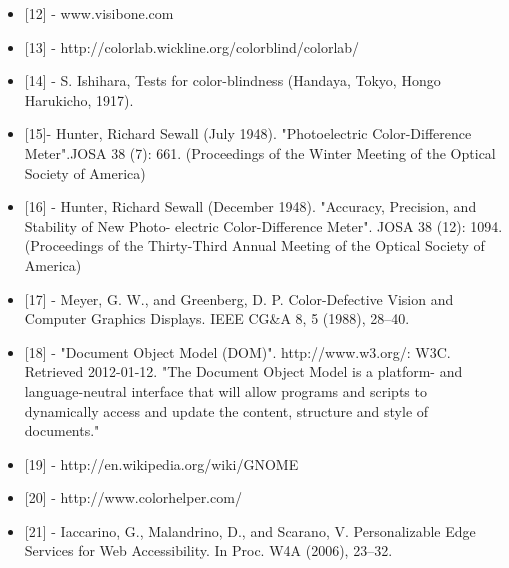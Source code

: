 \begin{itemize}
\item{[12]} - www.visibone.com

\item{[13]} - http://colorlab.wickline.org/colorblind/colorlab/

\item{[14]} - S. Ishihara, Tests for color-blindness (Handaya, Tokyo, Hongo Harukicho, 1917).

\item{[15]}- Hunter, Richard Sewall (July 1948). "Photoelectric Color-Difference Meter".JOSA 38 (7): 661.
(Proceedings of the Winter Meeting of the Optical Society of America)

\item{[16]} - Hunter, Richard Sewall (December 1948). "Accuracy, Precision, and Stability of New Photo-
electric Color-Difference Meter". JOSA 38 (12): 1094. (Proceedings of the Thirty-Third Annual Meeting
of the Optical Society of America)

\item{[17]} - Meyer, G. W., and Greenberg, D. P. Color-Defective Vision and Computer Graphics Displays.
IEEE CG\&A 8, 5 (1988), 28–40.

\item{[18]} - "Document Object Model (DOM)". http://www.w3.org/: W3C. Retrieved 2012-01-12. "The
Document Object Model is a platform- and language-neutral interface that will allow programs and
scripts to dynamically access and update the content, structure and style of documents."

\item{[19]} - http://en.wikipedia.org/wiki/GNOME

\item{[20]} - http://www.colorhelper.com/

\item{[21]} - Iaccarino, G., Malandrino, D., and Scarano, V. Personalizable Edge Services for Web Accessibility. In Proc. W4A (2006), 23–32.

\end{itemize}